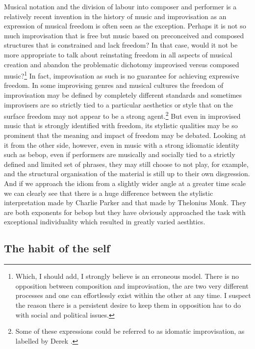 \documentclass[a4paper]{article}
\begin{document}
Musical notation and the division of labour into composer and performer is a relatively recent invention in the history of music and improvisation as an expression of musical freedom is often seen as the exception. Perhaps it is not so much improvisation that is free but music based on preconceived and composed structures that is constrained and lack freedom? In that case, would it not be more appropriate to talk about reinstating freedom in all aspects of musical creation and abandon the problematic dichotomy improvised versus composed music?\footnote{Which, I should add, I strongly believe is an erroneous model. There is no opposition between composition and improvisation, the are two very different processes and one can effortlessly exist within the other at any time. I suspect the reason there is a persistent desire to keep them in opposition has to do with social and political issues.} In fact, improvisation as such is no guarantee for achieving expressive freedom. In some improvising genres and musical cultures the freedom of improvisation may be defined by completely different standards and sometimes improvisers are so strictly tied to a particular aesthetics or style that on the surface freedom may not appear to be a strong agent.\footnote{Some of these expressions could be referred to as idomatic improvisation, as labelled by Derek \citet{bailey92}.} But even in improvised music that is strongly identified with freedom, its stylistic qualities may be so prominent that the meaning and impact of freedom may be debated. Looking at it from the other side, however, even in music with a strong idiomatic identity such as bebop, even if performers are musically and socially tied to a strictly defined and limited set of phrases, they may still choose to not play, for example, and the structural organisation of the material is still up to their own disgression. And if we approach the idiom from a slightly wider angle at a greater time scale we can clearly see that there is a huge difference between the stylistic interpretation made by Charlie Parker and that made by Thelonius Monk. They are both exponents for bebop but they have obviously approached the task with exceptional individuality which resulted in greatly varied aesthtics.

\subsection{The habit of the self}
\label{sec:habit-self}
\end{document}
